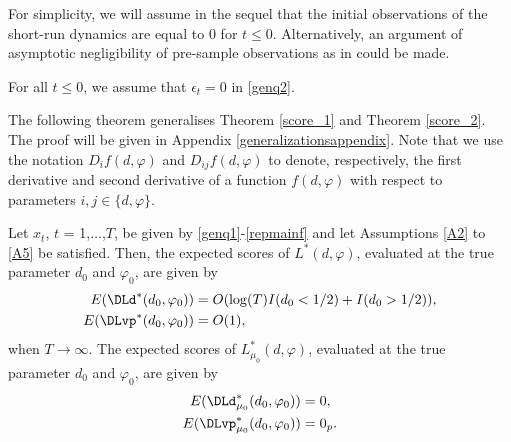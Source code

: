 {{For simplicity, we will assume in the sequel that the initial observations of the short-run dynamics are equal to $0$ for $t\leq 0$. Alternatively, an argument of asymptotic negligibility of pre-sample observations as in \textcite[Lemma 2]{hualde2011gaussian} could be made.
\begin{assumption}\label{A5}
 For all $t \leq 0$, we assume that $\epsilon_t = 0$  in \eqref{genq2}.
\end{assumption} 



The following theorem generalises Theorem \ref{score_1} and Theorem \ref{score_2}. The proof will be given in Appendix \ref{generalizationsappendix}. Note that we use the notation $D_i f(d, \varphi)$ and  $D_{ij} f(d, \varphi)$ to denote, respectively, the first derivative and second derivative of a function $f(d, \varphi)$ with respect to parameters $i,j \in \{d, \varphi\}$.  
\begin{theorem}\label{t52} 
Let $x_t$, $t$ = 1,$\ldots$,$T$, be given by \eqref{genq1}-\eqref{repmainf} and let Assumptions \ref{A2} to \ref{A5} be satisfied. Then, the expected scores of $L^* (d,\varphi)$, evaluated at the true parameter $d_0$ and $\varphi_0$, are given by
\begin{align}
    E( \DLd^*(d_0,\varphi_0)) &= O(\log(T)I(d_0 < 1/2) + I(d_0 > 1/2) ), \label{genscored}\\
    E( \DLvp^*(d_0,\varphi_0)) &=  O(1) \label{genscorevarphi},
\end{align}
when $T \rightarrow \infty$. The expected scores of $L_{\mu_0}^* (d,\varphi)$, evaluated at the true parameter $d_0$ and $\varphi_0$, are given by
\begin{align}
    E( \DLd_{\mu_0}^*(d_0,\varphi_0)) &= 0, \label{genscoredknown}\\
    E( \DLvp_{\mu_0}^*(d_0,\varphi_0)) &= 0_{p}. \label{genscorevarphiknown}
\end{align}

\end{theorem} 











}}

